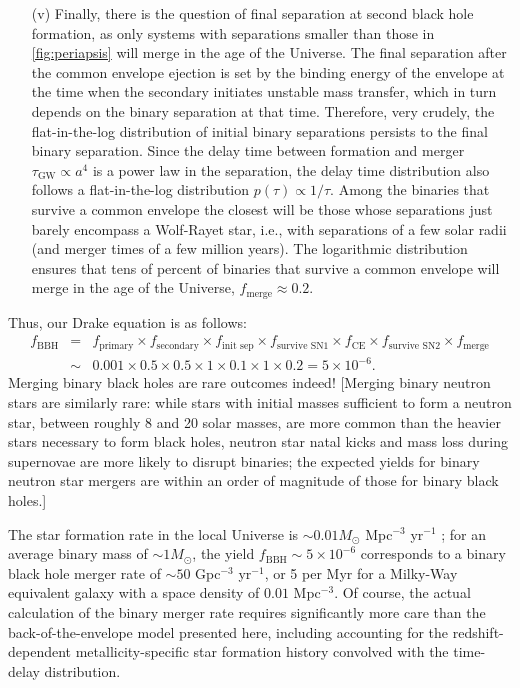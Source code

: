 \documentclass[iop,onecolumn]{revtex4}
\begin{document}
\begin{enumerate}
\item[(v)]  Finally, there is the question of final separation at second black hole formation, as only systems with separations smaller than those in \autoref{fig:periapsis} will merge in the age of the Universe.  The final separation after the common envelope ejection is set by the binding energy of the envelope at the time when the secondary initiates unstable mass transfer, which in turn depends on the binary separation at that time.  Therefore, very crudely, the flat-in-the-log distribution of initial binary separations persists to the final binary separation.  Since the delay time between formation and merger $\tau_\textrm{GW} \propto a^4$ is a power law in the separation, the delay time distribution also follows a flat-in-the-log distribution $p(\tau) \propto 1/\tau$.  Among the binaries that survive a common envelope the closest will be those whose separations just barely encompass a Wolf-Rayet star, i.e., with separations of a few solar radii (and merger times of a few million years).  The logarithmic distribution ensures that tens of percent of binaries that survive a common envelope will merge in the age of the Universe, $f_\textrm{merge} \approx 0.2$.
\end{enumerate}

Thus, our Drake equation is as follows:
\begin{eqnarray}
f_\textrm{BBH} &=& f_\textrm{primary} \times f_\textrm{secondary} \times f_\textrm{init sep} \times f_\textrm{survive SN1} \times f_\textrm{CE} \times f_\textrm{survive SN2} \times f_\textrm{merge} \nonumber \\
 & \sim & 0.001 \times 0.5 \times 0.5 \times 1 \times 0.1 \times 1 \times 0.2 = 5 \times 10^{-6}.
\end{eqnarray}
Merging binary black holes are rare outcomes indeed!  [Merging binary neutron stars are similarly rare: while stars with initial masses sufficient to form a neutron star, between roughly 8 and 20 solar masses, are more common than the heavier stars necessary to form black holes, neutron star natal kicks and mass loss during supernovae are more likely to disrupt binaries; the expected yields for binary neutron star mergers are within an order of magnitude of those for binary black holes.]

The star formation rate in the local Universe is $\sim 0.01 M_\odot$ Mpc$^{-3}$ yr$^{-1}$ \citep{MadauDickinson:2014}; for an average binary mass of $\sim 1 M_\odot$, the yield $f_\textrm{BBH} \sim 5 \times 10^{-6}$ corresponds to a binary black hole merger rate of $\sim 50$ Gpc$^{-3}$ yr$^{-1}$, or 5 per Myr for a Milky-Way equivalent galaxy with a space density of $0.01$ Mpc$^{-3}$.  Of course, the actual calculation of the binary merger rate requires significantly more care than the back-of-the-envelope model presented here, including accounting for the redshift-dependent metallicity-specific star formation history convolved with the time-delay distribution.  
\end{document}
